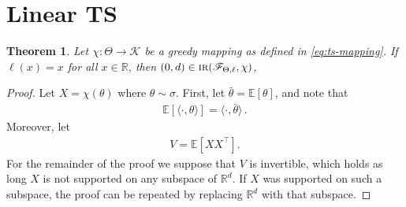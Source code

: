 \documentclass[letter, 12pt]{report}
\newcommand{\R}{\mathbb R}
\newcommand{\E}{\mathbb E}
\newcommand{\cK}{\mathcal K}
\newcommand{\sF}{\mathscr F}
\newcommand{\1}{\mathbf{1}}
\newcommand{\IR}{\operatorname{\textsc{ir}}}
\newcommand{\ts}{\textsc{TS}\xspace}
\theoremstyle{plain}
\newtheorem{theorem}{Theorem}
\theoremstyle{definition}
\theoremstyle{remark}
\begin{document}
\section{Linear \ts}
\begin{theorem}
    Let $\chi: \Theta \to \cK$ be a greedy mapping as defined in \cref{eq:ts-mapping}.
    If $\ell(x) = x$ for all $x \in \R$,
    then $(0, d) \in \IR(\sF_{\Theta, \ell}, \chi)$,
    \label{thm:ir-ts-linear}
\end{theorem}
\begin{proof}
    Let $X = \chi(\theta)$ where $\theta \sim \sigma$.
    First, let $\bar{\theta} = \E[\theta]$, and note that
    \begin{align*}
        \E[\langle \cdot, \theta \rangle] = \langle \cdot, \bar{\theta}\rangle\,.
    \end{align*}
    Moreover, let
    \begin{align*}
        V = \E[X X^\top].
    \end{align*}
    For the remainder of the proof we suppose that $V$ is invertible,
    which holds as long $X$ is not supported on any subspace of $\R^d$.
    If $X$ was supported on such a subspace, the proof can be repeated by replacing $\R^d$ with that subspace.


\end{proof}
\end{document}
